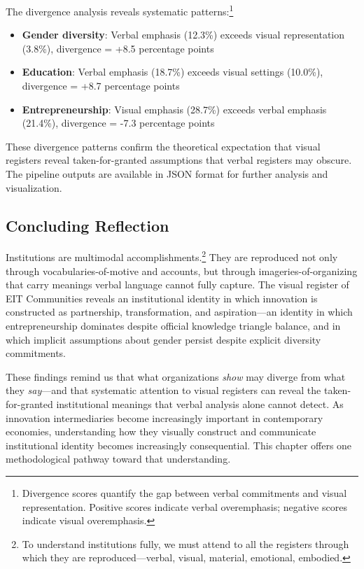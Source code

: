 \documentclass[../main.tex]{subfiles}
\begin{document}
The divergence analysis reveals systematic patterns:\footnote{Divergence scores quantify the gap between verbal commitments and visual representation. Positive scores indicate verbal overemphasis; negative scores indicate visual overemphasis.}

\begin{itemize}
    \item \textbf{Gender diversity}: Verbal emphasis (12.3\%) exceeds visual representation (3.8\%), divergence = +8.5 percentage points
    \item \textbf{Education}: Verbal emphasis (18.7\%) exceeds visual settings (10.0\%), divergence = +8.7 percentage points
    \item \textbf{Entrepreneurship}: Visual emphasis (28.7\%) exceeds verbal emphasis (21.4\%), divergence = -7.3 percentage points
\end{itemize}

These divergence patterns confirm the theoretical expectation that visual registers reveal taken-for-granted assumptions that verbal registers may obscure. The pipeline outputs are available in JSON format for further analysis and visualization.

\subsection{Concluding Reflection}

Institutions are multimodal accomplishments.\footnote{To understand institutions fully, we must attend to all the registers through which they are reproduced---verbal, visual, material, emotional, embodied.} They are reproduced not only through vocabularies-of-motive and accounts, but through imageries-of-organizing that carry meanings verbal language cannot fully capture. The visual register of EIT Communities reveals an institutional identity in which innovation is constructed as partnership, transformation, and aspiration---an identity in which entrepreneurship dominates despite official knowledge triangle balance, and in which implicit assumptions about gender persist despite explicit diversity commitments.

These findings remind us that what organizations \textit{show} may diverge from what they \textit{say}---and that systematic attention to visual registers can reveal the taken-for-granted institutional meanings that verbal analysis alone cannot detect. As innovation intermediaries become increasingly important in contemporary economies, understanding how they visually construct and communicate institutional identity becomes increasingly consequential. This chapter offers one methodological pathway toward that understanding.
\end{document}
